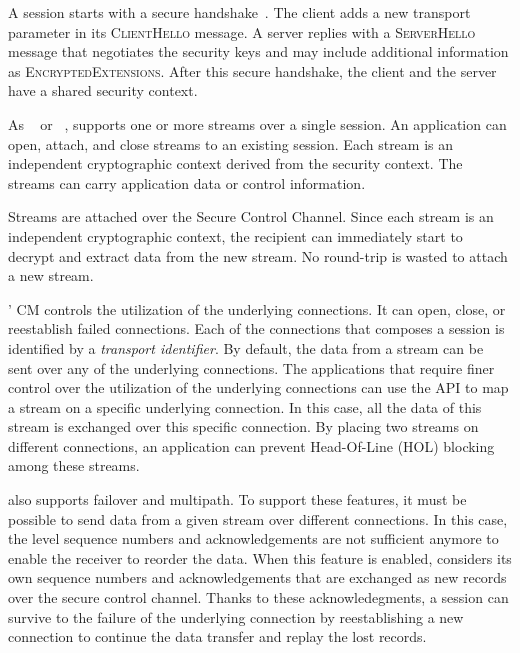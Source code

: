 A \tcpls session starts with a secure  handshake~\cite{rfc8446}. The
client adds a new \tcpls transport parameter in its \textsc{ClientHello}
message. A \tcpls server replies with a \textsc{ServerHello} message that
negotiates the security keys and may include additional \tcpls information as
\textsc{EncryptedExtensions}. After this secure handshake, the client and the
server have a shared security context.

As \sctp~\cite{rfc4960} or \quic~\cite{draft-ietf-quic-transport}, \tcpls
supports one or more streams over a single \tcpls session. An application can
open, attach, and close streams to an existing \tcpls session. Each stream is an
independent cryptographic context derived from the \tcpls security context. The
\tcpls streams can carry application data or control information.


Streams are attached over the Secure Control Channel. Since each stream is an
independent cryptographic context, the recipient can immediately start to
decrypt and extract data from the new stream. No round-trip is wasted to attach
a new stream.

\tcpls' CM controls the utilization of the underlying \tcp connections. It can open, close, or reestablish failed \tcp connections. Each of the connections that composes a \tcpls session is identified by a \emph{transport identifier}. By default, the data from a stream can be sent over any of the underlying \tcp connections. The applications that require finer control over the utilization of the underlying \tcp connections can use the \tcpls API to map a stream on a specific underlying connection. In this case, all the data of this stream is exchanged over this specific connection. By placing two streams on different connections, an application can prevent Head-Of-Line (HOL) blocking among these streams.

\tcpls also supports failover and multipath. To support these features, it must
be possible to send data from a given stream over different \tcp connections. In
this case, the \tcp level sequence numbers and acknowledgements are not
sufficient anymore to enable the receiver to reorder the data. When this feature
is enabled, \tcpls considers its own sequence numbers and acknowledgements that are exchanged as new \tls records over the secure control channel.  Thanks to these \tcpls acknowledegments, a \tcpls session can survive to the failure of the underlying \tcp connection by reestablishing a new \tcp connection to continue the data transfer and replay the lost records.

